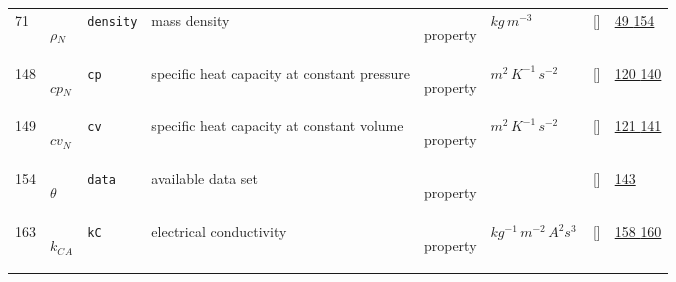 \begin{longtable}{|p{1cm}|p{3cm}|p{3cm}|p{7cm}|p{3.0cm}|p{3cm}|p{2cm}|p{1cm}|}
    71
             & \hypertarget{"v:71"}{ $ {\rho}{_{N}} $}
             & \verb|density|
             & mass density
             & \begin{lay}property \end{lay}
             & $ kg \,m^{-3} \, $
             & []
             & \hyperlink{"e:49"}{ 49 }
                 \hyperlink{"e:154"}{ 154 }
                 \\
    148
             & \hypertarget{"v:148"}{ $ {cp}{_{N}} $}
             & \verb|cp|
             & specific heat capacity at constant pressure
             & \begin{lay}property \end{lay}
             & $ m^{2} \,K^{-1} \,s^{-2} \, $
             & []
             & \hyperlink{"e:120"}{ 120 }
                 \hyperlink{"e:140"}{ 140 }
                 \\
    149
             & \hypertarget{"v:149"}{ $ {cv}{_{N}} $}
             & \verb|cv|
             & specific heat capacity at constant volume
             & \begin{lay}property \end{lay}
             & $ m^{2} \,K^{-1} \,s^{-2} \, $
             & []
             & \hyperlink{"e:121"}{ 121 }
                 \hyperlink{"e:141"}{ 141 }
                 \\
    154
             & \hypertarget{"v:154"}{ $ {\theta}{_{}} $}
             & \verb|data|
             & available data set
             & \begin{lay}property \end{lay}
             & $  $
             & []
             & \hyperlink{"e:143"}{ 143 }
                 \\
    163
             & \hypertarget{"v:163"}{ $ {k_{C}}{_{A}} $}
             & \verb|kC|
             & electrical conductivity
             & \begin{lay}property \end{lay}
             & $ kg^{-1} \,m^{-2} \,A^{2} s^{3} \, $
             & []
             & \hyperlink{"e:158"}{ 158 }
                 \hyperlink{"e:160"}{ 160 }
                 \\
    \end{longtable}